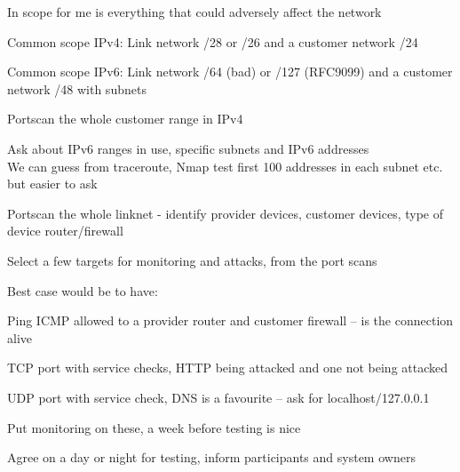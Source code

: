 \documentclass[Screen16to9,17pt]{foils}
\begin{document}



\begin{list2}
\item In scope for me is everything that could adversely affect the network
\item Common scope IPv4: Link network /28 or /26 and a customer network /24
\item Common scope IPv6: Link network /64 (bad) or /127 (RFC9099) and a customer network /48 with subnets
\end{list2}




\begin{alltt}
\item
\end{alltt}

\begin{list2}
\item Portscan the whole customer range in IPv4
\item Ask about IPv6 ranges in use, specific subnets and IPv6 addresses\\
We can guess from traceroute, Nmap test first 100 addresses in each subnet etc. but easier to ask
\item Portscan the whole linknet - identify provider devices, customer devices, type of device router/firewall
\end{list2}



Select a few targets for monitoring and attacks, from the port scans

Best case would be to have:
\begin{list2}
\item Ping ICMP allowed to a provider router and customer firewall -- is the connection alive
\item TCP port with service checks, HTTP being attacked and one not being attacked
\item UDP port with service check, DNS is a favourite -- ask for localhost/127.0.0.1
\item Put monitoring on these, a week before testing is nice
\item Agree on a day or night for testing, inform participants and system owners
\end{list2}
\end{document}
